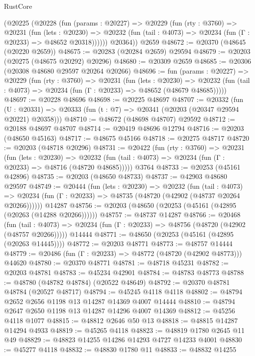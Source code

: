 \begin{lexlean}{RustCore}
\begin{coremodule}
      (@20225
        (@20228
          (fun (params : @20227) =>
          @20229
            (fun (rty : @3760) =>
            @20231
              (fun (lets : @20230) =>
              @20232 (fun (tail : @4073) => @20234 (fun (Γ : @20233) => @48652 @20318))))))
        @20364))
    @2659
@48672 := @20370 (@48645 (@20220 @2659))
@48675 := @20283 (@20284 @2659) @29594
@48679 := @20203 (@20275 (@48675 @20292) @20296)
@48680 := @20309 @2659
@48685 := @20306 (@20308 @48680 @29597 @20264 @20266)
@48696 := fun (params : @20227) =>
  @20229
    (fun (rty : @3760) =>
    @20231
      (fun (lets : @20230) =>
      @20232 (fun (tail : @4073) => @20234 (fun (Γ : @20233) => @48652 (@48679 @48685)))))
@48697 := @20228 @48696
@48698 := @20225 @48697
@48707 := @20332
    (fun (U : @20331) => @20333 (fun (t : @7) => @20341 (@20203 (@20347 @29594 @20221) @20358)))
@48710 := @48672 (@48698 @48707) @29592
@48712 := @20188 @48697 @48707
@48714 := @20419 @48696 @12794
@48716 := @20203 (@48650 @45163)
@48717 := @48675 @45166
@48718 := @20275 @48717
@48720 := @20203 (@48718 @20296)
@48731 := @20422
    (fun (rty : @3760) =>
    @20231
      (fun (lets : @20230) =>
      @20232 (fun (tail : @4073) => @20234 (fun (Γ : @20233) => @48716 (@48720 @48685)))))
    @3764
@48733 := @20253 (@45161 @42896)
@48735 := @20203 (@48650 @48733)
@48737 := @42903 @48680 @29597
@48749 := @20444
    (fun (lets : @20230) =>
    @20232
      (fun (tail : @4073) =>
      @20234 (fun (Γ : @20233) => @48735 (@48720 (@42902 (@48737 @20264 @20266))))))
    @14287
@48756 := @20203 (@48650 (@20253 (@45161 (@42895 (@20263 (@14288 @20266))))))
@48757 := @48737 @14287
@48766 := @20468
    (fun (tail : @4073) => @20234 (fun (Γ : @20233) => @48756 (@48720 (@42902 (@48757 @20266)))))
    @14444
@48771 := @48650 (@20253 (@45161 (@42895 (@20263 @14445))))
@48772 := @20203 @48771
@48773 := @48757 @14444
@48779 := @20486 (fun (Γ : @20233) => @48772 (@48720 (@42902 @48773))) @44620
@48780 := @20370 @48771
@48781 := @48718 @45231
@48782 := @20203 @48781
@48783 := @45234 @42901
@48784 := @48783 @48773
@48788 := @48780 (@48782 @48784) (@20522 @48649)
@48792 := @20370 @48781 @48784 (@20527 @48717)
@48794 := @45245 @4118 @4118
@48802 := @48794 @2652 @2656 @1198 @13 @14287 @14369 @4007 @14444
@48810 := @48794 @2647 @2650 @1198 @13 @14287 @14296 @4007 @14369
@48812 := @45256 @4118 @1077
@48815 := @48812 @2646 @50 @13
@48818 := @48815 @14287 @14294 @4933
@48819 := @45265 @4118
@48823 := @48819 @1780 @2645 @11 @49
@48829 := @48823 @14255 @14286 @14293 @4727 @14233 @4001
@48830 := @45277 @4118
@48832 := @48830 @1780 @11
@48833 := @48832 @14255

\end{coremodule}
\end{lexlean}
